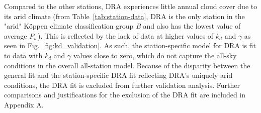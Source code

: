 \documentclass[preprint,12pt]{elsarticle}
\begin{document}

Compared to the other stations, DRA experiences little annual cloud cover due to its arid climate (from Table~\ref{tab:station-data}, DRA is the only station in the "arid" Köppen climate classification group \textit{B} and also has the lowest value of average $P_w$). This is reflected by the lack of data at higher values of $k_d$ and $\gamma$ as seen in Fig.~\ref{fig:kd_validation}. As such, the station-specific model for DRA is fit to data with $k_d$ and $\gamma$ values close to zero, which do not capture the all-sky conditions in the overall all-station model. Because of the disparity between the general fit and the station-specific DRA fit reflecting DRA's uniquely arid conditions, the DRA fit is excluded from further validation analysis. Further comparisons and justifications for the exclusion of the DRA fit are included in Appendix A.  
\end{document}
